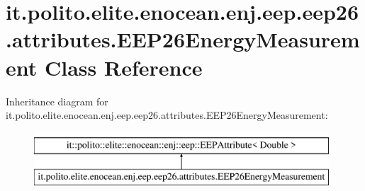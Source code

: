 \hypertarget{classit_1_1polito_1_1elite_1_1enocean_1_1enj_1_1eep_1_1eep26_1_1attributes_1_1_e_e_p26_energy_measurement}{}\section{it.\+polito.\+elite.\+enocean.\+enj.\+eep.\+eep26.\+attributes.\+E\+E\+P26\+Energy\+Measurement Class Reference}
\label{classit_1_1polito_1_1elite_1_1enocean_1_1enj_1_1eep_1_1eep26_1_1attributes_1_1_e_e_p26_energy_measurement}
Inheritance diagram for it.\+polito.\+elite.\+enocean.\+enj.\+eep.\+eep26.\+attributes.\+E\+E\+P26\+Energy\+Measurement\+:\begin{figure}[H]
\begin{center}
\leavevmode
\includegraphics[height=2.000000cm]{classit_1_1polito_1_1elite_1_1enocean_1_1enj_1_1eep_1_1eep26_1_1attributes_1_1_e_e_p26_energy_measurement}
\end{center}
\end{figure}
